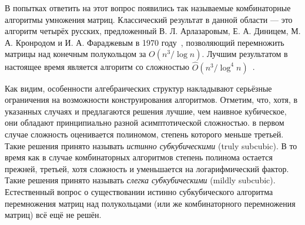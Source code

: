 В попытках ответить на этот вопрос появились так называемые комбинаторные алгоритмы умножения матриц. Классический результат в данной области --- это алгоритм четырёх русских, предложенный  В. Л. Арлазаровым, Е. А. Диницем, М. А. Кронродом и И. А. Фараджевым в 1970 году~, позволяющий перемножить матрицы над конечным полукольцом за $O(n^3/\log n)$. Лучшим результатом в настоящее время является алгоритм со сложностью $\hat{O}(n^3/\log^4 n)$~\cite{10.1007/978-3-662-47672-7_89}.

Как видим, особенности алгебраических структур накладывают серьёзные ограничения на возможности конструирования алгоритмов. Отметим, что, хотя, в указанных случаях и предлагаются решения лучшие, чем наивное кубическое, они обладают принципиально разной асимптотической сложностью. в первом случае сложность оценивается полиномом, степень которого меньше третьей. Такие решения принято называть \textit{истинно субкубическими} (truly subcubic). В то время как в случае комбинаторных алгоритмов степень полинома остается прежней, третьей, хотя сложность и уменьшается на логарифмический фактор. Такие решения принято называть \textit{слегка субкубическими} (mildly subcubic). Естественный вопрос о существовании истинно субкубического алгоритма перемножения матриц над полукольцами (или же комбинаторного перемножения матриц) всё ещё не решён.

